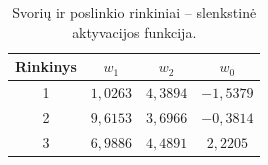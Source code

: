 \begin{table}[H]
    \centering
    \caption{Svorių ir poslinkio rinkiniai – slenkstinė aktyvacijos funkcija.}
    \label{tab:step_weights}
    \begin{tabular}{|c|c|c|c|}
        \hline
        \textbf{Rinkinys} & $w_1$ & $w_2$ & $w_0$ \\
        \hline
        1 & $1{,}0263$ & $4{,}3894$ & $-1{,}5379$ \\
        \hline
        2 & $9{,}6153$ & $3{,}6966$ & $-0{,}3814$ \\
        \hline
        3 & $6{,}9886$ & $4{,}4891$ & $2{,}2205$ \\
        \hline
    \end{tabular}
\end{table}